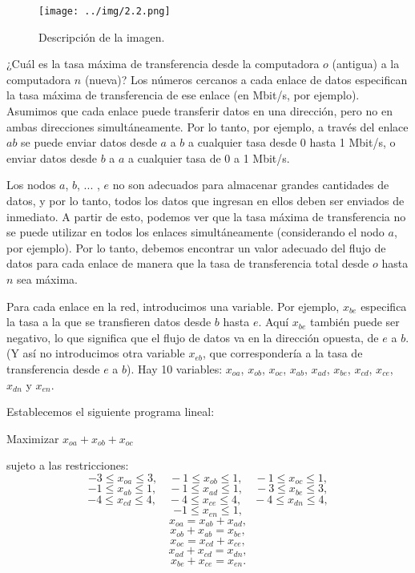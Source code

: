 \documentclass{article}
\begin{document}
\begin{figure}[H] %
\centering %
\texttt{[image: ../img/2.2.png]} %
\caption{Descripción de la imagen.} %
\label{fig:imagen} %
\end{figure}

¿Cuál es la tasa máxima de transferencia desde la computadora \(o\) (antigua) a la computadora \(n\) (nueva)? Los números cercanos a cada enlace de datos especifican la tasa máxima de transferencia de ese enlace (en Mbit/s, por ejemplo). Asumimos que cada enlace puede transferir datos en una dirección, pero no en ambas direcciones simultáneamente. Por lo tanto, por ejemplo, a través del enlace \(ab\) se puede enviar datos desde \(a\) a \(b\) a cualquier tasa desde 0 hasta 1 Mbit/s, o enviar datos desde \(b\) a \(a\) a cualquier tasa de 0 a 1 Mbit/s.

Los nodos \(a\), \(b\), ... , \(e\) no son adecuados para almacenar grandes cantidades de datos, y por lo tanto, todos los datos que ingresan en ellos deben ser enviados de inmediato. A partir de esto, podemos ver que la tasa máxima de transferencia no se puede utilizar en todos los enlaces simultáneamente (considerando el nodo \(a\), por ejemplo). Por lo tanto, debemos encontrar un valor adecuado del flujo de datos para cada enlace de manera que la tasa de transferencia total desde \(o\) hasta \(n\) sea máxima.

Para cada enlace en la red, introducimos una variable. Por ejemplo, \(x_{be}\) especifica la tasa a la que se transfieren datos desde \(b\) hasta \(e\). Aquí \(x_{be}\) también puede ser negativo, lo que significa que el flujo de datos va en la dirección opuesta, de \(e\) a \(b\). (Y así no introducimos otra variable \(x_{eb}\), que correspondería a la tasa de transferencia desde \(e\) a \(b\)). Hay 10 variables: \(x_{oa}\), \(x_{ob}\), \(x_{oc}\), \(x_{ab}\), \(x_{ad}\), \(x_{be}\), \(x_{cd}\), \(x_{ce}\), \(x_{dn}\) y \(x_{en}\).

Establecemos el siguiente programa lineal:

Maximizar \(x_{oa} + x_{ob} + x_{oc}\)

sujeto a las restricciones:
\[
-3 \leq x_{oa} \leq 3, \quad -1 \leq x_{ob} \leq 1, \quad -1 \leq x_{oc} \leq 1,
\]
\[
-1 \leq x_{ab} \leq 1, \quad -1 \leq x_{ad} \leq 1, \quad -3 \leq x_{be} \leq 3,
\]
\[
-4 \leq x_{cd} \leq 4, \quad -4 \leq x_{ce} \leq 4, \quad -4 \leq x_{dn} \leq 4,
\]
\[
-1 \leq x_{en} \leq 1,
\]
\[
x_{oa} = x_{ab} + x_{ad},
\]
\[
x_{ob} + x_{ab} = x_{be},
\]
\[
x_{oc} = x_{cd} + x_{ce},
\]
\[
x_{ad} + x_{cd} = x_{dn},
\]
\[
x_{be} + x_{ce} = x_{en}.
\]
\end{document}
